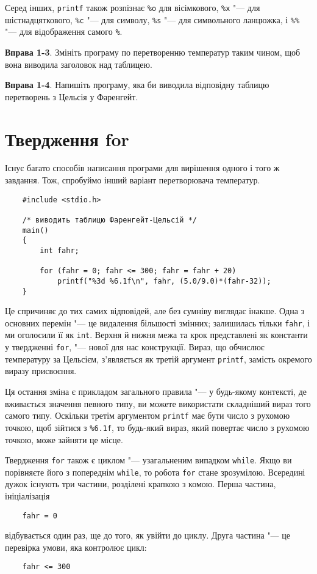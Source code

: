 \documentclass[a4paper,12pt]{book}
\begin{document}
  Серед інших,
  \texttt{printf} також розпізнає \texttt{\%o} для вісімкового, \texttt{\%x} "--- для
  шістнадцяткового, \texttt{\%c} "--- для символу, \texttt{\%s} "--- для символьного
  ланцюжка, і \texttt{\%\%} "--- для відображення самого \texttt{\%}.

  \textbf{Вправа 1-3}. Змініть програму по перетворенню температур таким чином, щоб вона
  виводила заголовок над таблицею.

  \textbf{Вправа 1-4}. Напишіть програму, яка би виводила відповідну таблицю перетворень з
  Цельсія у Фаренгейт.

\section{Твердження for}


  Існує багато способів написання програми для вирішення одного і того ж завдання.
  Тож, спробуймо інший варіант перетворювача температур.

  \begin{verbatim}
    #include <stdio.h>

    /* виводить таблицю Фаренгейт-Цельсій */
    main()
    {
        int fahr;

        for (fahr = 0; fahr <= 300; fahr = fahr + 20)
            printf("%3d %6.1f\n", fahr, (5.0/9.0)*(fahr-32));
    }
  \end{verbatim}

  Це спричиняє до тих самих відповідей, але без сумніву виглядає інакше. Одна з основних
  перемін "--- це видалення більшості змінних; залишилась тільки \texttt{fahr}, і ми
  оголосили її як \texttt{int}. Верхня й нижня межа та крок представлені як константи у
  твердженні \texttt{for}, "--- нової для нас конструкції. Вираз, що обчислює
  температуру за Цельсієм, з'являється як третій аргумент \texttt{printf}, замість
  окремого виразу присвоєння.

  Ця остання зміна є прикладом загального правила "--- у будь-якому контексті, де
  вживається значення певного типу, ви можете використати складніший вираз того самого
  типу. Оскільки третім аргументом \texttt{printf} має бути число з рухомою точкою, щоб
  зійтися з \texttt{\%6.1f}, то будь-який вираз, який повертає число з рухомою точкою, може
  зайняти це місце.

  Твердження \texttt{for} також є циклом "--- узагальненим випадком \texttt{while}.
  Якщо ви порівняєте його з попереднім \texttt{while}, то робота \texttt{for} стане
  зрозумілою. Всередині дужок існують три частини, розділені крапкою з комою. Перша
  частина, ініціалізація
  \begin{verbatim}
    fahr = 0
  \end{verbatim}
  відбувається один раз, ще до того, як увійти до циклу. Друга частина "--- це перевірка
  умови, яка контролює цикл:
  \begin{verbatim}
    fahr <= 300
  \end{verbatim}
\end{document}
